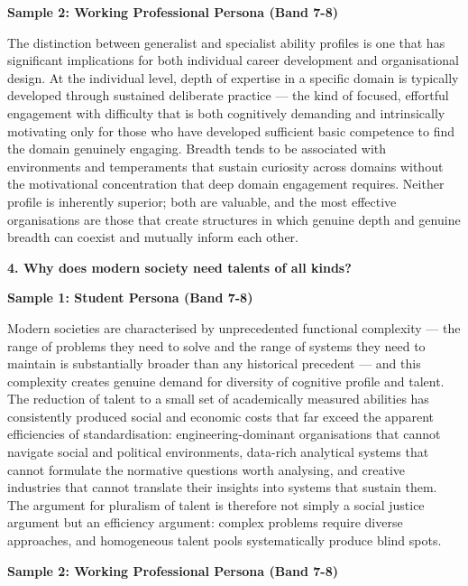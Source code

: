 \textbf{Sample 2: Working Professional Persona (Band 7-8)}

The distinction between generalist and specialist ability profiles is one that has significant implications for both individual career development and organisational design. At the individual level, depth of expertise in a specific domain is typically developed through sustained deliberate practice — the kind of focused, effortful engagement with difficulty that is both cognitively demanding and intrinsically motivating only for those who have developed sufficient basic competence to find the domain genuinely engaging. Breadth tends to be associated with environments and temperaments that sustain curiosity across domains without the motivational concentration that deep domain engagement requires. Neither profile is inherently superior; both are valuable, and the most effective organisations are those that create structures in which genuine depth and genuine breadth can coexist and mutually inform each other.

\separator

\begin{ieltsquestion}
\textbf{4. Why does modern society need talents of all kinds?}
\end{ieltsquestion}
\textbf{Sample 1: Student Persona (Band 7-8)}

Modern societies are characterised by unprecedented functional complexity — the range of problems they need to solve and the range of systems they need to maintain is substantially broader than any historical precedent — and this complexity creates genuine demand for diversity of cognitive profile and talent. The reduction of talent to a small set of academically measured abilities has consistently produced social and economic costs that far exceed the apparent efficiencies of standardisation: engineering-dominant organisations that cannot navigate social and political environments, data-rich analytical systems that cannot formulate the normative questions worth analysing, and creative industries that cannot translate their insights into systems that sustain them. The argument for pluralism of talent is therefore not simply a social justice argument but an efficiency argument: complex problems require diverse approaches, and homogeneous talent pools systematically produce blind spots.

\textbf{Sample 2: Working Professional Persona (Band 7-8)}

